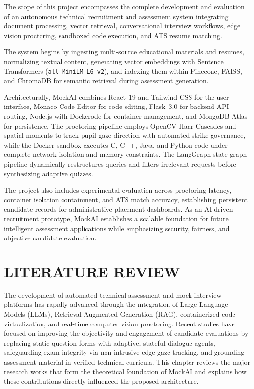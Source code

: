 \documentclass[12pt,a4paper]{report}
\begin{document}
The scope of this project encompasses the complete development and evaluation of an
autonomous technical recruitment and assessment system integrating document processing,
vector retrieval, conversational interview workflows, edge vision proctoring, sandboxed
code execution, and ATS resume matching.

The system begins by ingesting multi-source educational materials and resumes,
normalizing textual content, generating vector embeddings with Sentence Transformers
(\texttt{all-MiniLM-L6-v2}), and indexing them within Pinecone, FAISS, and ChromaDB
for semantic retrieval during assessment generation.

Architecturally, MockAI combines React~19 and Tailwind CSS for the user interface,
Monaco Code Editor for code editing, Flask~3.0 for backend API routing, Node.js with
Dockerode for container management, and MongoDB Atlas for persistence. The proctoring
pipeline employs OpenCV Haar Cascades and spatial moments to track pupil gaze direction
with automated strike governance, while the Docker sandbox executes C, C++, Java, and
Python code under complete network isolation and memory constraints. The LangGraph
state-graph pipeline dynamically restructures queries and filters irrelevant requests before
synthesizing adaptive quizzes.

The project also includes experimental evaluation across proctoring latency, container
isolation containment, and ATS match accuracy, establishing persistent candidate records
for administrative placement dashboards. As an AI-driven recruitment prototype, MockAI
establishes a scalable foundation for future intelligent assessment applications while
emphasizing security, fairness, and objective candidate evaluation.

\chapter{LITERATURE REVIEW}

The development of automated technical assessment and mock interview platforms has
rapidly advanced through the integration of Large Language Models (LLMs),
Retrieval-Augmented Generation (RAG), containerized code virtualization, and real-time
computer vision proctoring. Recent studies have focused on improving the objectivity and
engagement of candidate evaluations by replacing static question forms with adaptive,
stateful dialogue agents, safeguarding exam integrity via non-intrusive edge gaze tracking,
and grounding assessment material in verified technical curricula. This chapter reviews the
major research works that form the theoretical foundation of MockAI and explains how
these contributions directly influenced the proposed architecture.
\end{document}
